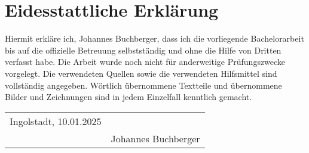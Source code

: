 {}
\section*{Eidesstattliche Erklärung}
\vspace{1.0cm}
Hiermit erkläre ich, Johannes Buchberger, dass ich die vorliegende Bachelorarbeit bis auf die offizielle Betreuung selbstständig und ohne die Hilfe von Dritten verfasst habe.
Die Arbeit wurde noch nicht für anderweitige Prüfungszwecke vorgelegt. 
Die verwendeten Quellen sowie die verwendeten Hilfsmittel sind vollständig angegeben.
Wörtlich übernommene Textteile und übernommene Bilder und Zeichnungen sind in jedem Einzelfall kenntlich gemacht.
\vspace{2.0cm}\\

\begin{tabular}{@{}p{6cm}p{6cm}@{}}
Ingolstadt, 10.01.2025 & \hrulefill \\
& Johannes Buchberger \\
\end{tabular}
